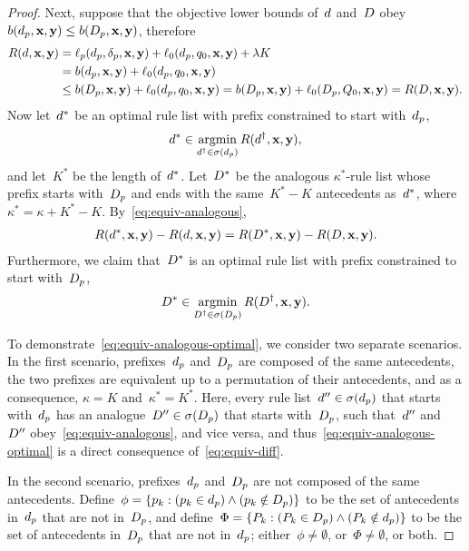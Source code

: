 \begin{arxiv}
\begin{proof}
Next, suppose that the objective lower bounds of~${d}$ and~${D}$
obey ${b(d_p, \mathbf{x}, \mathbf{y}) \le b(D_p, \mathbf{x}, \mathbf{y})}$, therefore
\begin{align}
R({d}, \mathbf{x}, \mathbf{y})
&= \ell_p(d_p, \delta_p, \mathbf{x}, \mathbf{y}) + \ell_0(d_p, q_0, \mathbf{x}, \mathbf{y}) + {\lambda} K \nonumber \\
&= b(d_p, \mathbf{x}, \mathbf{y}) + \ell_0(d_p, q_0, \mathbf{x}, \mathbf{y}) \nonumber \\
&\le b(D_p, \mathbf{x}, \mathbf{y}) + \ell_0(d_p, q_0, \mathbf{x}, \mathbf{y})
= b(D_p, \mathbf{x}, \mathbf{y}) + \ell_0(D_p, Q_0, \mathbf{x}, \mathbf{y})
= R({D}, \mathbf{x}, \mathbf{y}).
\label{eqref:equiv-ineq}
\end{align}
Now let~${d}^*$ be an optimal rule list with prefix
constrained to start with~$d_p$,
\begin{align}
{d}^* \in \operatorname*{argmin}_{{d}^\dagger \in \sigma(d_p)} R({d}^\dagger, \mathbf{x}, \mathbf{y}),
\end{align}
and let~$K^*$ be the length of~${d}^*$.
%
Let~${D}^*$ be the analogous $\kappa^*$-rule list whose prefix starts
with~$D_p$ and ends with the same~${K^* - K}$ antecedents as~${d}^*$,
where~${\kappa^* = \kappa + K^* - K}$.
%
By~\eqref{eq:equiv-analogous},
\begin{align}
R({d}^*, \mathbf{x}, \mathbf{y}) - R({d}, \mathbf{x}, \mathbf{y})
= R({D}^*, \mathbf{x}, \mathbf{y}) - R({D}, \mathbf{x}, \mathbf{y}).
\label{eq:equiv-diff}
\end{align}
Furthermore, we claim that~${D}^*$ is an optimal rule list
with prefix constrained to start with~$D_p$,
\begin{align}
{D}^* \in \operatorname*{argmin}_{{D}^\dagger \in \sigma(D_p)} R({D}^\dagger, \mathbf{x}, \mathbf{y}).
\label{eq:equiv-analogous-optimal}
\end{align}

To demonstrate~\eqref{eq:equiv-analogous-optimal},
we consider two separate scenarios.
%
In the first scenario, prefixes~$d_p$ and~$D_p$
are composed of the same antecedents,
\ie the two prefixes are equivalent up to a permutation of
their antecedents, and as a consequence,
${\kappa = K}$ and~${\kappa^* = K^*}$.
%
Here, every rule list~${{d}'' \in \sigma(d_p)}$
that starts with~$d_p$
has an analogue~${{D}'' \in \sigma(D_p)}$
that starts with~$D_p$,
such that~${d}''$ and~${D}''$ obey~\eqref{eq:equiv-analogous},
and vice versa, and thus~\eqref{eq:equiv-analogous-optimal}
is a direct consequence of~\eqref{eq:equiv-diff}.

In the second scenario, prefixes~$d_p$ and~$D_p$
are not composed of the same antecedents.
%
Define~${\phi = \{p_k : (p_k \in d_p) \wedge (p_k \notin D_p)\}}$
to be the set of antecedents in~$d_p$ that are not in~$D_p$,
and define~${\Phi = \{P_k : (P_k \in D_p) \wedge (P_k \notin d_p)\}}$
to be the set of antecedents in~$D_p$ that are not in~$d_p$;
either~${\phi \neq \emptyset}$, or~${\Phi \neq \emptyset}$, or both.


\end{proof}
\end{arxiv}
